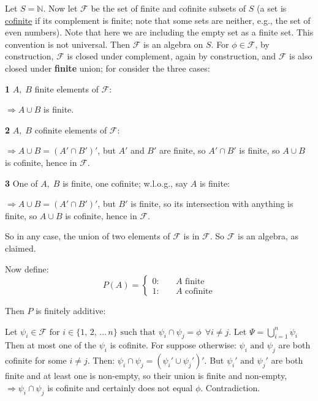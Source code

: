 \documentclass[12pt,a4paper]{article}
\begin{document}
Let $S = \mathbb{N}$. Now let $\mathcal{F}$ be the set of finite and cofinite subsets of $S$ (a set is \underline{cofinite} if its complement is finite; note that some sets are neither, e.g., the set of even numbers). Note that here we are including the empty set as a finite set. This convention is not universal. Then $\mathcal{F}$ is an algebra on $S$. For $\phi\in\mathcal{F}$, by construction, $\mathcal{F}$ is closed under complement, again by construction, and $\mathcal{F}$ is also closed under \textbf{finite} union; for consider the three cases:\par
\vspace{10pt}
\textbf{1 }  $A,\;B$ finite elements of $\mathcal{F}$:\par
\vspace{10pt}
\indent $\Rightarrow A\cup B$ is finite.\par
\vspace{10pt}
\textbf{2 }  $A,\;B$ cofinite elements of $\mathcal{F}$:\par
\vspace{10pt}
\indent $\Rightarrow A\cup B = (A'\cap B')'$, but $A'$ and $B'$ are finite, so $A'\cap B'$ is finite, so $A\cup B$ is cofinite, hence in $\mathcal{F}.$\par
\vspace{10pt}
\textbf{3 }  One of $A,\;B$ is finite, one cofinite; w.l.o.g., say $A$ is finite:\par
\vspace{10pt}
\indent $\Rightarrow A\cup B = (A'\cap B')'$, but $B'$ is finite, so its intersection with anything is finite, so $A\cup B$ is cofinite, hence in $\mathcal{F}.$

So in any case, the union of two elements of $\mathcal{F}$ is in $\mathcal{F}$. So $\mathcal{F}$ is an algebra, as claimed.\par

Now define:
$$P(A) = \left\{\begin{array}{ll} 0:\quad & A \text{ finite}\\ 1:\quad & A \text{ cofinite}\end{array}\right.$$

Then $P$ is finitely additive:\par
Let $\psi_i\in\mathcal{F} \text{ for } i \in \{1,\,2,\,...\,n\} \text{ such that } \psi_i \cap \psi_j = \phi \:\:\forall i\neq j$.
Let $\Psi = \bigcup\limits_{i=1}^{n}\psi_i$\\
\indent Then at most one of the $\psi_i$ is cofinite. For suppose otherwise: $\psi_i \text{ and } \psi_j$ are both cofinite for some $i\neq j$. Then: $\psi_i \cap \psi_j = (\psi_i' \cup \psi_j')'$. But $\psi_i' \text{ and } \psi_j'$ are both finite and at least one is non-empty, so their union is finite and non-empty, $\Rightarrow \psi_i \cap \psi_j$ is cofinite and certainly does not equal $\phi$. Contradiction.\par
\end{document}
